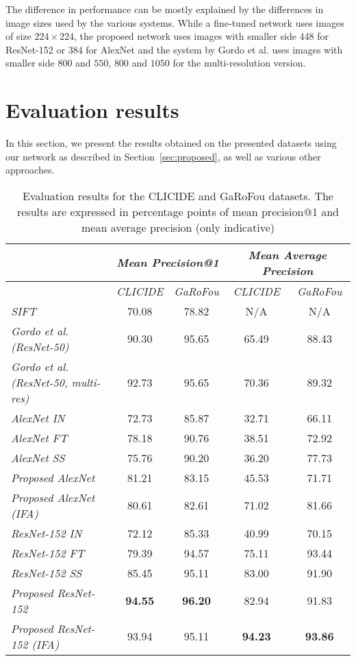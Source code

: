 The difference in performance can be mostly explained by the
differences in image
sizes used by the various systems. While a fine-tuned network uses
images of size $224 \times 224$, the proposed network uses images
with smaller side $448$ for ResNet-152 or $384$ for AlexNet and the
system by Gordo et al. uses images with smaller side $800$ and $550$,
$800$ and $1050$ for the multi-resolution version.

\section{Evaluation results}\label{sec:evalresults}
In this section, we present the results obtained on the presented datasets
using our network as described in Section~\ref{sec:proposed}, as well
as various other approaches.

\begin{table}
\begin{tabular}{|l|c|c||c|c|}
\hline & \multicolumn{2}{c||}{\emph{Mean Precision@1}} &
\multicolumn{2}{c|}{\emph{Mean Average Precision}}\\
\hline & \emph{CLICIDE} & \emph{GaRoFou} & \emph{CLICIDE} & \emph{GaRoFou}\\
\hline \emph{SIFT} & 70.08 & 78.82 & N/A & N/A\\
\hline \emph{Gordo et al.~\cite{gordo_deep_2016} (ResNet-50)}
& 90.30 & 95.65 & 65.49 & 88.43\\
\hline \emph{Gordo et al.~\cite{gordo_deep_2016} (ResNet-50, multi-res)}
& 92.73 & 95.65 & 70.36 & 89.32\\
\hline \emph{AlexNet IN} & 72.73 & 85.87 & 32.71 & 66.11\\
\hline \emph{AlexNet FT} & 78.18 & 90.76 & 38.51 & 72.92\\
\hline \emph{AlexNet SS} & 75.76 & 90.20 & 36.20 & 77.73\\
\hline \emph{Proposed AlexNet} & 81.21 & 83.15 & 45.53 & 71.71\\
\hline \emph{Proposed AlexNet (IFA)} & 80.61 & 82.61 & 71.02 & 81.66\\
\hline \emph{ResNet-152 IN} & 72.12 & 85.33 & 40.99 & 70.15\\
\hline \emph{ResNet-152 FT} & 79.39 & 94.57 & 75.11 & 93.44\\
\hline \emph{ResNet-152 SS} & 85.45 & 95.11 & 83.00 & 91.90\\
\hline \emph{Proposed ResNet-152} & \textbf{94.55} & \textbf{96.20}
& 82.94 & 91.83\\
\hline \emph{Proposed ResNet-152 (IFA)} & 93.94 & 95.11
& \textbf{94.23} & \textbf{93.86}\\
\hline
\end{tabular}
\caption{Evaluation results for the CLICIDE and GaRoFou datasets.
The results are expressed in percentage points of
mean precision@1 and mean average precision (only indicative)
\label{tab:results}}
\end{table}

